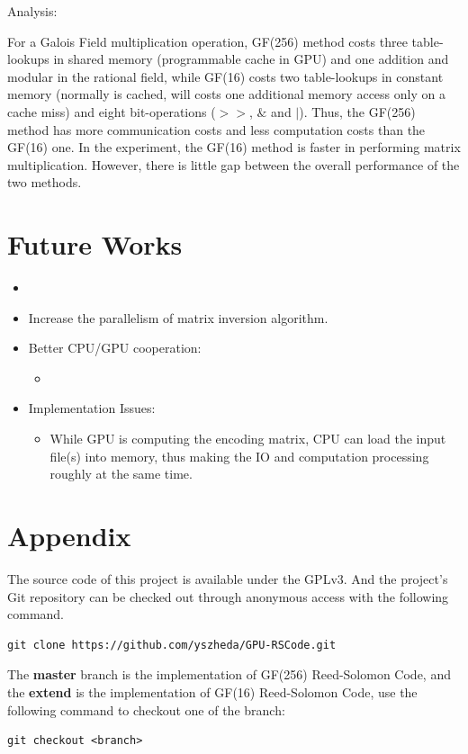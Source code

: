 \documentclass[a4paper]{article}
\begin{document}
Analysis:

For a Galois Field multiplication operation, GF(256) method costs three table-lookups in shared memory (programmable cache in GPU) and one addition and modular in the rational field, while GF(16) costs two table-lookups in constant memory (normally is cached, will costs one additional memory access only on a cache miss) and eight bit-operations ($>>$, $\&$ and $|$).
Thus, the GF(256) method has more communication costs and less computation costs than the GF(16) one.
In the experiment, the GF(16) method is faster in performing matrix multiplication.
However, there is little gap between the overall performance of the two methods.

\section{Future Works}
\begin{itemize}
	\item 
	\item Increase the parallelism of matrix inversion algorithm.
	\item Better CPU/GPU cooperation:								
	\begin{itemize}
		\item 
	\end{itemize}
	\item Implementation Issues:
	\begin{itemize}
		\item While GPU is computing the encoding matrix, CPU can load the input file(s) into memory,
thus making the IO and computation processing roughly at the same time.
	\end{itemize}
\end{itemize}

\section{Appendix}

The source code of this project is available under the GPLv3. And the project's Git repository can be checked out through anonymous access with the following command.
\begin{verbatim}
git clone https://github.com/yszheda/GPU-RSCode.git
\end{verbatim}

The \textbf{master} branch is the implementation of GF(256) Reed-Solomon Code, and the \textbf{extend} is the implementation of GF(16) Reed-Solomon Code, use the following command to checkout one of the branch:
\begin{verbatim}
git checkout <branch>
\end{verbatim}





\end{document}
